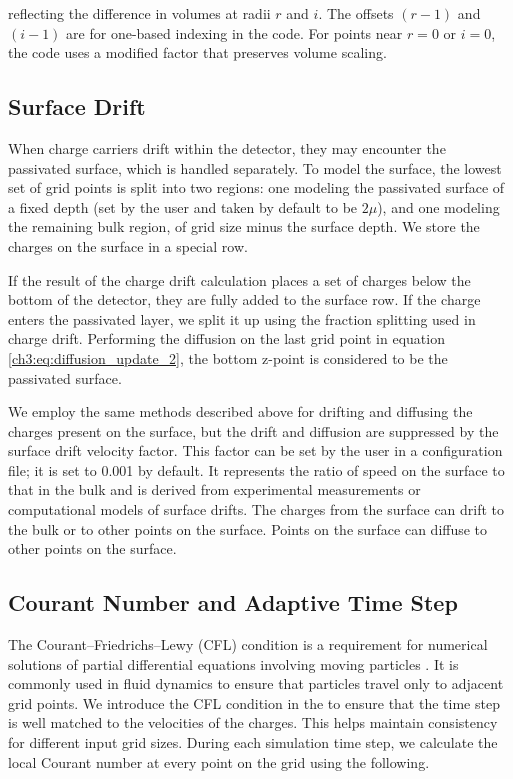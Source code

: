 \noindent
reflecting the difference in volumes at radii $r$ and $i$.
The offsets $(r-1)$ and $(i-1)$ are for one-based indexing in the code. For points near $r=0$ or $i=0$, the code uses a modified factor that preserves volume scaling. 

\subsection{Surface Drift}
When charge carriers drift within the detector, they may encounter the passivated surface, which is handled separately. To model the surface, the lowest set of grid points is split into two regions: one modeling the passivated surface of a fixed depth (set by the user and taken by default to be $2\mu$), and one modeling the remaining bulk region, of grid size minus the surface depth. We store the charges on the surface in a special row. 

If the result of the charge drift calculation places a set of charges below the bottom of the detector, they are fully added to the surface row. If the charge enters the passivated layer, we split it up using the fraction splitting used in charge drift. Performing the diffusion on the last grid point in equation \ref{ch3:eq:diffusion_update_2}, the bottom z-point is considered to be the passivated surface. 

We employ the same methods described above for drifting and diffusing the charges present on the surface, but the drift and diffusion are suppressed by the surface drift velocity factor. This factor can be set by the user in a configuration file; it is set to 0.001 by default. It represents the ratio of speed on the surface to that in the bulk and is derived from experimental measurements or computational models of surface drifts. The charges from the surface can drift to the bulk or to other points on the surface. Points on the surface can diffuse to other points on the surface.

\subsection{Courant Number and Adaptive Time Step}
\label{ch3_sec_courant}
The Courant–Friedrichs–Lewy (CFL) condition is a requirement for numerical solutions of partial differential equations involving moving particles \cite{cfl_condition}. It is commonly used in fluid dynamics to ensure that particles travel only to adjacent grid points. We introduce the CFL condition in the {\ehd} to ensure that the time step is well matched to the velocities of the charges. This helps maintain consistency for different input grid sizes. During each simulation time step, we calculate the local Courant number at every point on the grid using the following.

